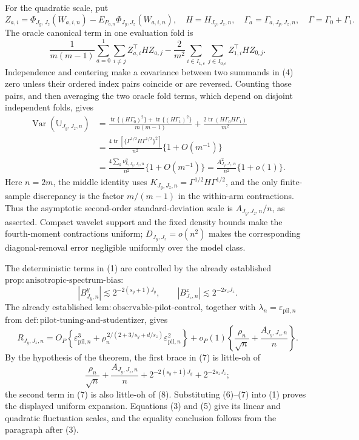 For the quadratic scale, put
\[
Z_{a,i}=\Phi_{J_y,J_z}(W_{a,i,n})-E_{P_{a,n}}\Phi_{J_y,J_z}(W_{a,i,n}),
\quad H=H_{J_y,J_z,n},\quad \Gamma_a=\Gamma_{a,J_y,J_z,n},
\quad \Gamma=\Gamma_0+\Gamma_1.
\]
The oracle canonical term in one evaluation fold is
\[
\frac{1}{m(m-1)}\sum_{a=0}^1\sum_{i\ne j}Z_{a,i}^{\top}HZ_{a,j}
-\frac{2}{m^2}\sum_{i\in I_{1,e}}\sum_{j\in I_{0,e}}Z_{1,i}^{\top}HZ_{0,j}. \tag{4}
\]
Independence and centering make a covariance between two summands in (4) zero unless their ordered index pairs coincide or are reversed.  Counting those pairs, and then averaging the two oracle fold terms, which depend on disjoint independent folds, gives
\[
\begin{aligned}
\operatorname{Var}(\mathbb U_{J_y,J_z,n})
&=\frac{\operatorname{tr}\{(H\Gamma_0)^2\}+\operatorname{tr}\{(H\Gamma_1)^2\}}{m(m-1)}
+\frac{2\operatorname{tr}(H\Gamma_0H\Gamma_1)}{m^2}\\
&=\frac{4\operatorname{tr}\!\left[\{\Gamma^{1/2}H\Gamma^{1/2}\}^2\right]}{n^2}\{1+O(m^{-1})\}\\
&=\frac{4\sum_k\nu_{k,J_y,J_z,n}^2}{n^2}\{1+O(m^{-1})\}
=\frac{A_{J_y,J_z,n}^2}{n^2}\{1+o(1)\}.                                \tag{5}
\end{aligned}
\]
Here \(n=2m\), the middle identity uses \(K_{J_y,J_z,n}=\Gamma^{1/2}H\Gamma^{1/2}\), and the only finite-sample discrepancy is the factor \(m/(m-1)\) in the within-arm contractions.  Thus the asymptotic second-order standard-deviation scale is \(A_{J_y,J_z,n}/n\), as asserted.  Compact wavelet support and the fixed density bounds make the fourth-moment contractions uniform; \(D_{J_y,J_z}=o(n^2)\) makes the corresponding diagonal-removal error negligible uniformly over the model class.

The deterministic terms in (1) are controlled by the already established \(\mathrm{prop{:}anisotropic\text{-}spectrum\text{-}bias}\):
\[
|B^y_{J_y,n}|\lesssim2^{-2(s_y+1)J_y},
\qquad
|B^z_{J_z,n}|\lesssim2^{-2s_zJ_z}.                                      \tag{6}
\]
The already established \(\mathrm{lem{:}observable\text{-}pilot\text{-}control}\), together with \(\lambda_n=\varepsilon_{\mathrm{pil},n}\) from \(\mathrm{def{:}pilot\text{-}tuning\text{-}and\text{-}studentizer}\), gives
\[
R_{J_y,J_z,n}
=O_P\!\left\{\varepsilon_{\mathrm{pil},n}^3
+\rho_n^{\,2/(2+3/s_y+d/s_z)}\varepsilon_{\mathrm{pil},n}^2\right\}
+o_P(1)\left\{\frac{\rho_n}{\sqrt n}+\frac{A_{J_y,J_z,n}}n\right\}.   \tag{7}
\]
By the hypothesis of the theorem, the first brace in (7) is little-oh of
\[
\frac{\rho_n}{\sqrt n}+\frac{A_{J_y,J_z,n}}n
+2^{-2(s_y+1)J_y}+2^{-2s_zJ_z};                                         \tag{8}
\]
the second term in (7) is also little-oh of (8).  Substituting (6)--(7) into (1) proves the displayed uniform expansion.  Equations (3) and (5) give its linear and quadratic fluctuation scales, and the equality conclusion follows from the paragraph after (3).

